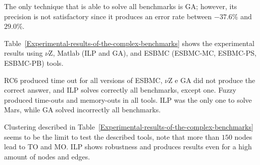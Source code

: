 The only technique that is able to solve all benchmarks is GA; however, its precision is not satisfactory since it produces an error rate between $-37.6$\% and $29.0$\%.

Table~\ref{Experimental-results-of-the-complex-benchmarks} shows the experimental results using $\nu$Z, Matlab (ILP and GA), and ESBMC (ESBMC\hyp{}MC, ESBMC\hyp{}PS, ESBMC\hyp{}PB) tools.

RC$6$ produced time out for all versions of ESBMC, $\nu$Z e GA did not produce the correct answer, and ILP solves correctly all benchmarks, except one. Fuzzy produced time-outs and memory-outs in all tools. ILP was the only one to solve Mars, while GA solved incorrectly all benchmarks.

Clustering described in Table~\ref{Experimental-results-of-the-complex-benchmarks} seems to be the limit to test the described tools, note that more than $150$ nodes lead to TO and MO. ILP shows robustness and produces results even for a high amount of nodes and edges.

